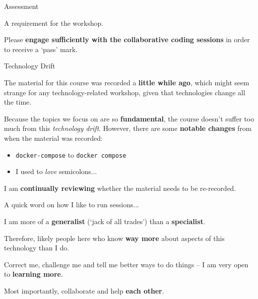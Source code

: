 \documentclass[10pt, dvipsnames, table, aspectratio=169]{beamer}
\begin{document}

\begin{frame}[fragile]{Assessment}

A requirement for the workshop.

Please \textbf{engage sufficiently with the collaborative coding sessions} in order to receive a `pass' mark.

\end{frame}


\begin{frame}[fragile]{Technology Drift}

The material for this course was recorded a \textbf{little while ago}, which might seem strange for any technology-related workshop, given that technologies change all the time.

Because the topics we focus on are so \textbf{fundamental}, the course doesn't suffer too much from this \emph{technology drift}.
However, there are some \textbf{notable changes} from when the material was recorded:

\begin{itemize}
    \item \texttt{docker-compose} to \texttt{docker compose}
    \item I used to \emph{love} semicolons...
\end{itemize}

I am \textbf{continually reviewing} whether the material needs to be re-recorded.

\end{frame}


\begin{frame}[fragile]{A quick word on how I like to run sessions...}

I am more of a \textbf{generalist} (`jack of all trades') than a \textbf{specialist}.

Therefore, likely people here who know \textbf{way more} about aspects of this technology than I do.

Correct me, challenge me and tell me better ways to do things -- I am very open to \textbf{learning more}.

Most importantly, collaborate and help \textbf{each other}.

\end{frame}
\end{document}
